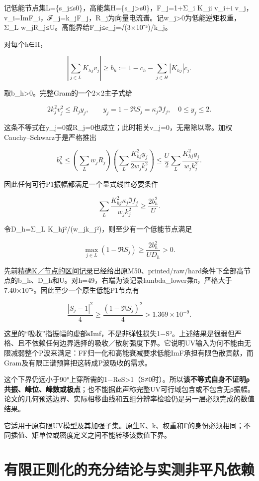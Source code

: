 \documentclass[
  10pt,
  a4paper,
]{article}
\begin{document}
记低能节点集L=\{s\_j≤s0\}，高能集H=\{s\_j\textgreater s0\}，F\_j=1+Σ\_i
K\_ji v\_i+i
v\_j，v\_i=ImF\_i，ℱ\_j=k\_jF\_j，R\_j为向量电流谱。记w\_j\textgreater0为低能逆矩权重，Σ\_L
w\_jR\_j≤U。高能界给\textbar F\_j\textbar≤c\_j=√(3×10⁻⁵)/k\_j。

对每个h∈H，

\[
\left|\sum_{j\in L}K_{hj}v_j\right|
\ge b_h:=1-c_h-\sum_{j\in H}|K_{hj}|c_j.
\]

取b\_h\textgreater0。完整Gram的一个2×2主子式给

\[
2k_j^2v_j^2\le R_j y_j,\qquad
 y_j=1-\Re S_j=\kappa_j\Im f_j,\quad0\le y_j\le2.
\]

这条不等式在y\_j=0或R\_j=0也成立；此时相关v\_j=0，无需除以零。加权Cauchy--Schwarz于是严格推出

\[
 b_h^2\le
 \left(\sum_{L}w_jR_j\right)
 \left(\sum_L\frac{K_{hj}^2 y_j}{2w_jk_j^2}\right)
 \le\frac U2\sum_L\frac{K_{hj}^2y_j}{w_jk_j^2}.
\]

因此任何可行P1振幅都满足一个显式线性必要条件

\[
\boxed{\sum_L\frac{K_{hj}^2\kappa_j\Im f_j}{w_jk_j^2}
\ge\frac{2b_h^2}{U}}.
\]

令D\_h=Σ\_L K\_hj²/(w\_jk\_j²)，则至少有一个低能节点满足

\[
\max_{j\in L}(1-\Re S_j)
\ge\frac{2b_h^2}{U D_h}>0.
\]

先前\href{../GLOBAL_IR_UV_EXCLUSION.json}{精确K／节点的区间记录}已经给出原M50、printed/raw/hard条件下全部高节点的b\_h、D\_h和U。对h=49，右端为该记录lambda\_lower乘π，严格大于7.40×10⁻⁵。因此至少一个原生低能P1节点有

\[
\frac{|S_j-1|^2}{4}\ge\frac{(1-\Re S_j)^2}{4}
>1.369\times10^{-9}.
\]

这里的``吸收''指振幅的虚部κImf，不是非弹性损失1−\textbar S\textbar²。上述结果是很弱但严格、且不依赖任何边界选择的吸收／散射强度下界。它说明UV输入为何不能由无限减弱整个P波来满足：FF归一化和高能衰减要求低能ImF承担有限色散贡献，而Gram及有限正谱预算把这转成P波吸收的需求。

这个下界仍远小于90°上穿所需的1−ReS\textgreater1（S≠0时）。所以\textbf{该不等式自身不证明ρ共振、峰位、峰数或极点}；也不能据此声称完整UV可行域包含或不包含无ρ振幅。论文的几何预选边界、实际相移曲线和五组分辨率检验仍是另一层必须完成的数值结果。

它适用于原有限UV模型及其加强子集。原生K、k、权重和Γ的身份必须相同；不同插值、矩单位或密度定义之间不能转移该数值下界。

\newpage

\section{有限正则化的充分结论与实测非平凡依赖}\label{ux6709ux9650ux6b63ux5219ux5316ux7684ux5145ux5206ux7ed3ux8bbaux4e0eux5b9eux6d4bux975eux5e73ux51e1ux4f9dux8d56}
\end{document}
